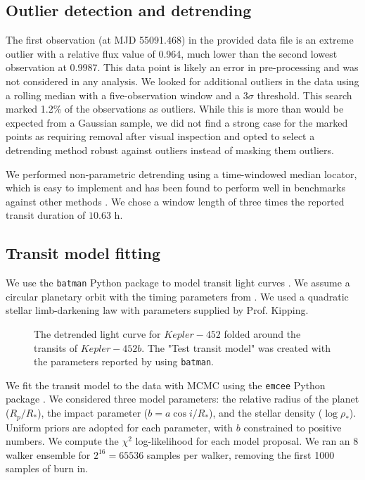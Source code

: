 \documentclass[modern]{aastex631}
\begin{document}
\subsection{Outlier detection and detrending}

The first observation (at MJD 55091.468) in the provided data file is an extreme outlier with a relative flux value of 0.964, much lower than the second lowest observation at 0.9987. This data point is likely an error in pre-processing and was not considered in any analysis. We looked for additional outliers in the data using a rolling median with a five-observation window and a $3 \sigma$ threshold. This search marked 1.2\% of the observations as outliers. While this is more than would be expected from a Gaussian sample, we did not find a strong case for the marked points as requiring removal after visual inspection and opted to select a detrending method robust against outliers instead of masking them outliers.

We performed non-parametric detrending using a time-windowed median locator, which is easy to implement and has been found to perform well in benchmarks against other methods \citep{hippkeWotanComprehensiveTimeseries2019}. We chose a window length of three times  the reported transit duration of $10.63$ h.

\subsection{Transit model fitting}
We use the \texttt{batman} Python package to model transit light curves \citep{2015PASP..127.1161K}. We assume a circular planetary orbit with the timing parameters from \citet{jenkinsDISCOVERYVALIDATIONKepler452b2015}. We used a quadratic stellar limb-darkening law with parameters supplied by Prof. Kipping.

\begin{figure}[!ht]
    \caption{The detrended light curve for $Kepler-452$ folded around the transits of $Kepler-452b$. The "Test transit model" was created with the parameters reported by \citet{jenkinsDISCOVERYVALIDATIONKepler452b2015} using \texttt{batman}.}
    \label{fig:model_test}
\end{figure}

We fit the transit model to the data  with MCMC using the \texttt{emcee} Python package \citep{2013PASP..125..306F}. We considered three model parameters: the relative radius of the planet ($R_p / R_\ast$), the impact parameter ($b = a \cos i / R_\ast$), and the stellar density ($\log \rho_\ast$). Uniform priors are adopted for each parameter, with $b$ constrained to positive numbers. We compute the $\chi^2$ log-likelihood for each model proposal. We ran an 8 walker ensemble for $2^{16} = 65536$ samples per walker, removing the first 1000 samples of burn in.
\end{document}
